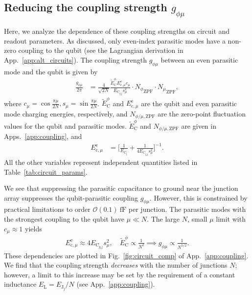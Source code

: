 \documentclass[%
reprint,
superscriptaddress,
 amsmath,amssymb,
 aps,
 prx,
longbibliography,
floatfix,
]{revtex4-2}
\begin{document}
\subsection{Reducing the coupling strength $g_{\phi \mu}$}

Here, we analyze the dependence of these coupling strengths on circuit and readout parameters. As discussed, only even-index parasitic modes have a non-zero coupling to the qubit (see the Lagrangian derivation in App.~\ref{app:alt_circuits}). The coupling strength $g_{\phi \mu}$ between an even parasitic mode and the qubit is given by~\cite{viola2015collective}
\begin{align}
\frac{g_{\phi\mu}}{2\pi}&=\frac{4}{\sqrt{2N}} \frac{\tilde{E}^\phi_\textrm{C}E^\textrm{e}_{\textrm{c},\mu}c_\mu}{E_{\textrm{C}_\textrm{g,j}}s_\mu^2} \cdot {N_\phi}_{\mathrm{ZPF}} \cdot {N_\mu}_{\mathrm{ZPF}},
\end{align}
where $c_\mu=\cos{\frac{\pi\mu}{2N}}, s_\mu = \sin \frac{\pi \mu}{2N}$. $\tilde{E}_\textrm{C}^\phi$ and $E^\textrm{e}_{\textrm{c},\mu}$ are the qubit and even parasitic mode charging energies, respectively, and $N_{\phi/\mu,\mathrm{ZPF}}$ are the zero-point fluctuation values for the qubit and parasitic modes. $\tilde{E}_\textrm{C}^\phi$ and $N_{\phi/\mu,\mathrm{ZPF}}$ are given in Apps.~\ref{app:coupling}, and
\begin{align}
E_{\textrm{c},\mu}^\textrm{e}&=\Big[\frac{1}{E_{\textrm{C}_\textrm{j}}}+\frac{1}{4E_{\textrm{C}_\textrm{g,j}}s_\mu^2}\Big]^{-1}.\label{eq:parasitic}
\end{align}
All the other variables represent independent quantities listed in Table~\ref{tab:circuit_params}.

We see that suppressing the parasitic capacitance to ground near the junction array suppresses the qubit-parasitic coupling $g_{\phi\mu}$. However, this is constrained by practical limitations to order $\mathcal{O}(0.1) \ \mathrm{fF}$ per junction. The parasitic modes with the strongest coupling to the qubit have $\mu\ll N$. The large $N$, small $\mu$ limit with $c_\mu\approx 1$ yields
\begin{align}
    E^\textrm{e}_{\textrm{c},\mu}\approx 4E_{\textrm{C}_\textrm{g,j}}s_\mu^2, \quad \tilde{E}^\phi_\textrm{C}\propto \frac{1}{N^2}\implies g_{\phi\mu}\propto \frac{1}{N^{5/2}}.\label{eq:dep1}
\end{align}
These dependencies are plotted in Fig.~\ref{fig:circuit_comp} of App.~\ref{app:coupling}. We find that the coupling strength \textit{decreases} with the number of junctions $N$; however, a limit to this increase may be set by the requirement of a constant inductance $E_\textrm{L}=E_{\textrm{J}_\textrm{j}}/N$ (see App.~\ref{app:coupling}).
\end{document}
